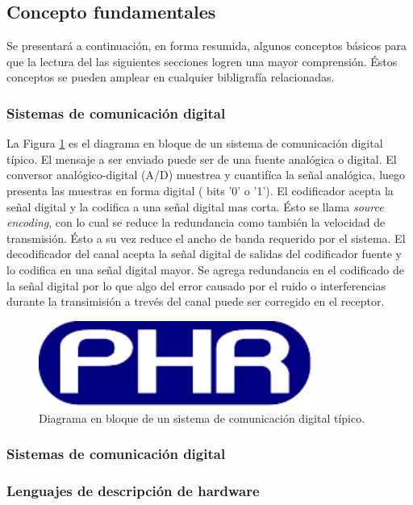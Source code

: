 \documentclass[a4paper]{article}
\begin{document}
\subsection{Concepto	fundamentales}
\label{sec:concept}
Se presentará a continuación, en forma resumida, algunos conceptos básicos para que la lectura del las siguientes secciones logren una mayor comprensión. Éstos conceptos se pueden amplear en cualquier bibligrafía relacionadas.
\subsubsection{Sistemas de comunicación digital}
La Figura \ref{fig:com_sys} es el diagrama en bloque de un sistema de comunicación digital típico. El mensaje a ser enviado puede ser de una fuente analógica o digital. El conversor analógico-digital (A/D) muestrea y cuantifíca la señal analógica, luego presenta las muestras en forma digital ( bits '0' o '1'). El codificador acepta la señal digital y la codifica a una señal digital mas corta. Ésto se llama \textsl{source encoding}, con lo cual se reduce la redundancia como también la velocidad de transmisión. Ésto a su vez reduce el ancho de banda requerido por el sistema. El decodificador del canal acepta la señal digital de salidas del codificador fuente y lo codifica en una señal digital mayor. Se agrega redundancia en el codificado de la señal digital por lo que algo del error causado por el ruido o interferencias durante la transimisión a trevés del canal puede ser corregido en el receptor. 
\begin{figure}
  \centering
  \includegraphics[width=0.8\textwidth]{images/logov2_ES}
  \caption{Diagrama en bloque de un sistema de comunicación digital típico.}
  \label{fig:com_sys}
\end{figure}
\subsubsection{Sistemas de comunicación digital}

\subsubsection{Lenguajes de descripción de hardware}
\end{document}
